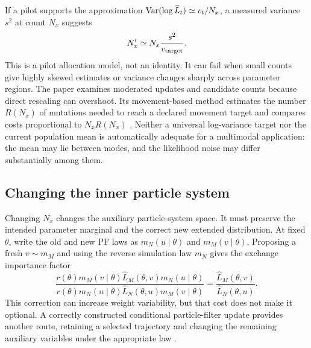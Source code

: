 If a pilot supports the approximation
$\operatorname{Var}(\log\widehat L_t)\simeq v_t/N_x$, a measured variance $s^2$ at
count $N_x$ suggests
\begin{equation}
 N_x'\simeq N_x\frac{s^2}{v_{\rm target}}.
 \label{eq:bf-is-smc2-variance-allocation}
\end{equation}
This is a pilot allocation model, not an identity. It can fail when small
counts give highly skewed estimates or variance changes sharply across
parameter regions. The paper examines moderated updates and candidate
counts because direct rescaling can overshoot. Its movement-based method
estimates the number $R(N_x)$ of mutations needed to reach a declared
movement target and compares costs proportional to $N_xR(N_x)$
\citep[Section 4.2 and Algorithm 5]{botha2023adaptivesmc2}.
Neither a universal log-variance target nor the current population mean
is automatically adequate for a multimodal application: the mean may lie
between modes, and the likelihood noise may differ substantially among them.

\subsection{Changing the inner particle system}
\label{sec:bf-is-smc2-refresh}

Changing $N_x$ changes the auxiliary particle-system space. It must preserve
the intended parameter marginal and the correct new extended distribution.
At fixed $\theta$, write the old and new PF laws as $m_N(u\mid\theta)$
and $m_M(v\mid\theta)$. Proposing a fresh $v\sim m_M$ and using the
reverse simulation law $m_N$ gives the exchange importance factor
\begin{equation}
 \frac{r(\theta)m_M(v\mid\theta)\widehat L_M(\theta,v)
                         m_N(u\mid\theta)}
      {r(\theta)m_N(u\mid\theta)\widehat L_N(\theta,u)
                         m_M(v\mid\theta)}
 =\frac{\widehat L_M(\theta,v)}{\widehat L_N(\theta,u)}.
 \label{eq:bf-is-smc2-exchange}
\end{equation}
This correction can increase weight variability, but that cost does not
make it optional. A correctly constructed conditional particle-filter
update provides another route, retaining a selected trajectory and
changing the remaining auxiliary variables under the appropriate law
\citep[Section 3.6]{chopin2013smc2}.

